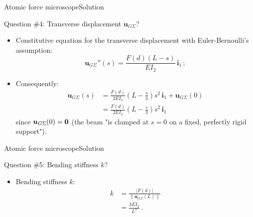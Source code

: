 \documentclass{beamer}
\newcommand{\uj}{u}
\newcommand{\uv}{{\boldsymbol\uj}}
\renewcommand{\ij}{i}
\newcommand{\iv}{{\boldsymbol\ij}}
\newcommand{\bzero}{{\bf 0}}
\newcommand{\norm}[1]{\left\|#1\right\|}
\newcommand{\abs}[1]{\left|#1\right|}
\begin{document}
\begin{frame}{Atomic force microscope}{Solution}
\begin{overprint}
\vskip-20pt
\begin{exampleblock}{Question \#4: Transverse displacement $\uv_{G\Sigma}$?}
\begin{itemize}
\item Constitutive equation for the transverse displacement with Euler-Bernoulli's assumption:
\begin{displaymath}
\uv_{G\Sigma}''(s)=\frac{F(d)(L-s)}{EI_2}\,\iv_1\,;
\end{displaymath}
\item Consequently:
\begin{displaymath}
\begin{split}
\uv_{G\Sigma}(s) &= \frac{F(d)}{2EI_2}\left(L-\frac{s}{3}\right)s^2\,\iv_1+\uv_{G\Sigma}(0) \\
&= \frac{F(d)}{2EI_2}\left(L-\frac{s}{3}\right)s^2\,\iv_1
\end{split}
\end{displaymath}
since $\uv_{G\Sigma}(0)=\bzero$ (the beam "is clamped at $s=0$ on a fixed, perfectly rigid support").
\end{itemize}
\end{exampleblock}

\end{overprint}

\end{frame}

\begin{frame}{Atomic force microscope}{Solution}

\vskip-55pt
\begin{exampleblock}{Question \#5: Bending stiffness $k$?}
\begin{itemize}
\item Bending stiffness $k$:
\begin{displaymath}
\begin{split}
k &=\frac{\abs{F(d)}}{\norm{\uv_{G\Sigma}(L)}} \\
&=\frac{3EI_2}{L^3}\,.
\end{split}
\end{displaymath}
\end{itemize}
\end{exampleblock}

\end{frame}
\end{document}
